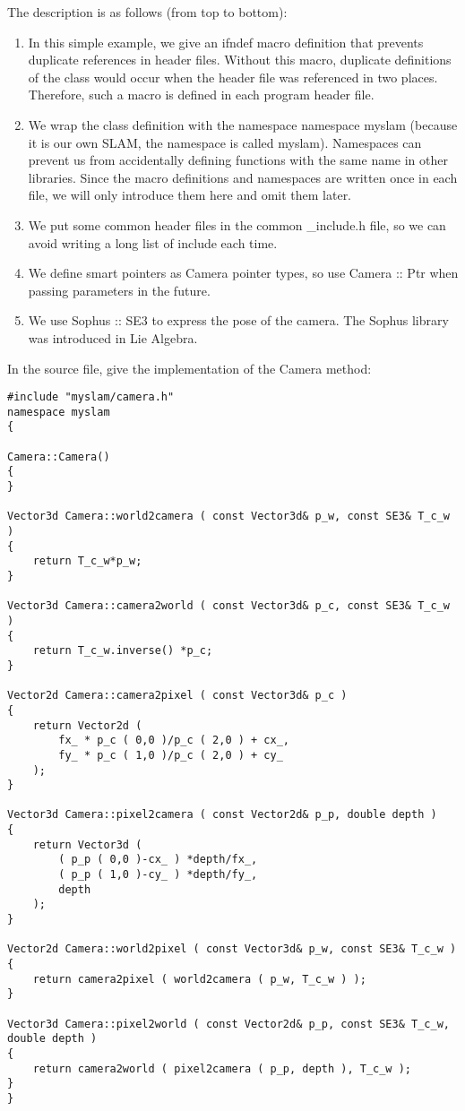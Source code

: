 The description is as follows (from top to bottom):
\begin{enumerate}
\item In this simple example, we give an ifndef macro definition that prevents duplicate references in header files. Without this macro, duplicate definitions of the class would occur when the header file was referenced in two places. Therefore, such a macro is defined in each program header file.
\item We wrap the class definition with the namespace namespace myslam (because it is our own SLAM, the namespace is called myslam). Namespaces can prevent us from accidentally defining functions with the same name in other libraries. Since the macro definitions and namespaces are written once in each file, we will only introduce them here and omit them later.
\item We put some common header files in the common \_include.h file, so we can avoid writing a long list of include each time.
\item We define smart pointers as Camera pointer types, so use Camera :: Ptr when passing parameters in the future.
\item We use Sophus :: SE3 to express the pose of the camera. The Sophus library was introduced in Lie Algebra.
\end{enumerate}

In the source file, give the implementation of the Camera method:
\begin{lstlisting}[language = c ++, caption = slambook/project/0.1/src/camera.cpp]
#include "myslam/camera.h"
namespace myslam
{

Camera::Camera()
{
}

Vector3d Camera::world2camera ( const Vector3d& p_w, const SE3& T_c_w )
{
	return T_c_w*p_w;
}

Vector3d Camera::camera2world ( const Vector3d& p_c, const SE3& T_c_w )
{
	return T_c_w.inverse() *p_c;
}

Vector2d Camera::camera2pixel ( const Vector3d& p_c )
{
	return Vector2d (
		fx_ * p_c ( 0,0 )/p_c ( 2,0 ) + cx_,
		fy_ * p_c ( 1,0 )/p_c ( 2,0 ) + cy_
	);
}

Vector3d Camera::pixel2camera ( const Vector2d& p_p, double depth )
{
	return Vector3d (
		( p_p ( 0,0 )-cx_ ) *depth/fx_,
		( p_p ( 1,0 )-cy_ ) *depth/fy_,
		depth
	);
}

Vector2d Camera::world2pixel ( const Vector3d& p_w, const SE3& T_c_w )
{
	return camera2pixel ( world2camera ( p_w, T_c_w ) );
}

Vector3d Camera::pixel2world ( const Vector2d& p_p, const SE3& T_c_w, double depth )
{
	return camera2world ( pixel2camera ( p_p, depth ), T_c_w );
}
}
\end{lstlisting}


